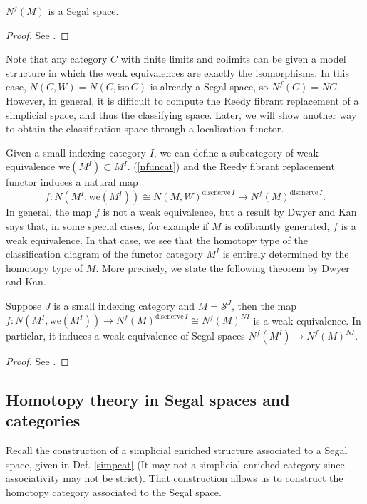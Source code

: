 \begin{refsection}
\begin{thm}
$N^f(M)$ is a Segal space.
\end{thm}
\begin{proof}
See \cite[Thm 8.3]{rezk}.
\end{proof}

Note that any category $C$ with finite limits and colimits can be given a model structure in which the weak equivalences are exactly the isomorphisms. In this case, $N(C,W)=N(C,\mathrm{iso}\,C)$ is already a Segal space, so $N^f(C)=NC$. However, in general, it is difficult to compute the Reedy fibrant replacement of a simplicial space, and thus the classifying space. Later, we will show another way to obtain the classification space through a localisation functor.

Given a small indexing category $I$, we can define a subcategory of weak equivalence $\mathrm{we}(M^I)\subset M^I$. (\ref{nfuncat}) and the Reedy fibrant replacement functor induces a natural map
$$f:N(M^I,\mathrm{we}(M^I))\cong N(M,W)^{\mathrm{discnerve}\,I}\to N^f(M)^{\mathrm{discnerve}\,I}.$$
In general, the map $f$ is not a weak equivalence, but a result by Dwyer and Kan says that, in some special cases, for example if $M$ is cofibrantly generated, $f$ is a weak equivalence. In that case, we see that the homotopy type of the classification diagram of the functor category $M^I$ is entirely determined by the homotopy type of $M$. More precisely, we state the following theorem by Dwyer and Kan.
\begin{thm}
Suppose $J$ is a small indexing category and $M=\mathcal S^J$, then the map $f:N(M^I,\mathrm{we}(M^I))\to N^f(M)^{\mathrm{discnerve}\,I}\cong N^f(M)^{NI}$ is a weak equivalence. In particlar, it induces a weak equivalence of Segal spaces $N^f(M^I)\to N^f(M)^{NI}$.
\end{thm}
\begin{proof}
See \cite[Thm 8.11]{rezk}.
\end{proof}


\subsection{Homotopy theory in Segal spaces and categories}
Recall the construction of a simplicial enriched structure associated to a Segal space, given in Def. \ref{simpcat} (It may not a simplicial enriched category since associativity may not be strict). That construction allows us to construct the homotopy category associated to the Segal space.


\end{refsection}
